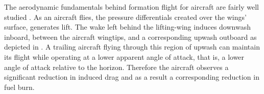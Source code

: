 	The aerodynamic fundamentals behind formation flight for aircraft are fairly well studied \cite{Okolo2014,Pahle2012,Ning2011,Liu2015,Blake2004a}. As an aircraft flies, the pressure differentials created over the wings' surface, generates lift. The wake left behind the lifting-wing induces downwash inboard, between the aircraft wingtips, and a corresponding upwash outboard as depicted in . A trailing aircraft flying through this region of upwash can maintain its flight while operating at a lower apparent angle of attack, that is, a lower angle of attack relative to the horizon. Therefore the aircraft observes a significant reduction in induced drag and as a result a corresponding reduction in fuel burn. 




